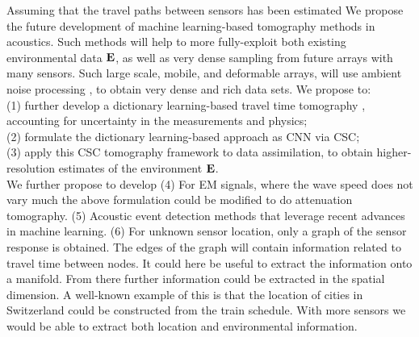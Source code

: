 Assuming that the travel paths between sensors has been estimated\cite{sabra2005,gerstoft2006} We propose the future development of machine learning-based tomography methods in acoustics. Such methods will help to more fully-exploit both existing environmental data $\bf E$, as well as very dense sampling from future arrays with many sensors. Such large scale, mobile, and deformable arrays, will use ambient noise processing \cite{sabra2005}, to obtain very dense and rich data sets. We propose  to: \\
(1) further develop a dictionary learning-based travel time tomography \cite{bianco2018}, accounting for uncertainty in the measurements and physics; \\
(2) formulate the dictionary learning-based approach as CNN via CSC; \\
(3) apply this CSC tomography framework to  data assimilation, to obtain higher-resolution estimates of the environment $\bf E$. \\

We further propose to develop  
(4) For EM signals, where the wave speed does not vary much the above formulation could be modified to do attenuation tomography.
(5) Acoustic event detection methods that leverage recent advances in machine learning.
(6) For unknown sensor location, only a graph of the sensor response is obtained. The edges of the graph will contain information related to travel time between nodes. It could here be useful to extract the information onto a manifold. From there further information could be extracted in the spatial dimension. A well-known example of this is that the location of cities in Switzerland could be constructed from the train schedule\cite{docmani2015}. With more sensors we would be able to extract both location and environmental information.  

